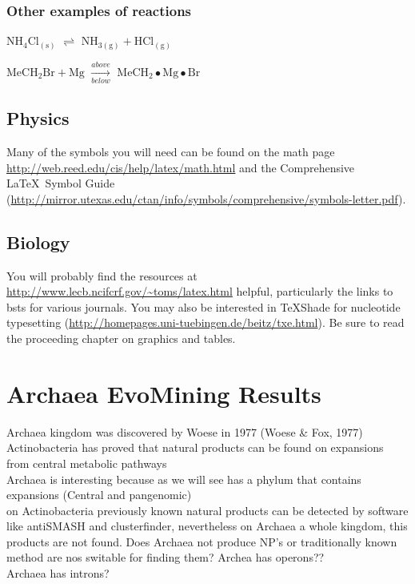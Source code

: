 \documentclass[12pt,twoside]{reedthesis}
\begin{document}
  \subsection{Other examples of
  reactions}\label{other-examples-of-reactions}
  
  \(\mathrm{NH_4Cl_{(s)}}\) \(\rightleftharpoons\)
  \(\mathrm{NH_{3(g)}+HCl_{(g)}}\)
  
  \noindent \(\mathrm{MeCH_2Br + Mg}\) \(\xrightarrow[below]{above}\)
  \(\mathrm{MeCH_2\bullet Mg \bullet Br}\)
  
  \section{Physics}\label{physics}
  
  Many of the symbols you will need can be found on the math page
  \url{http://web.reed.edu/cis/help/latex/math.html} and the Comprehensive
  \LaTeX~Symbol Guide
  (\url{http://mirror.utexas.edu/ctan/info/symbols/comprehensive/symbols-letter.pdf}).
  
  \section{Biology}\label{biology}
  
  You will probably find the resources at
  \url{http://www.lecb.ncifcrf.gov/~toms/latex.html} helpful, particularly
  the links to bsts for various journals. You may also be interested in
  TeXShade for nucleotide typesetting
  (\url{http://homepages.uni-tuebingen.de/beitz/txe.html}). Be sure to
  read the proceeding chapter on graphics and tables.
  
  \hypertarget{refux5flabels}{\chapter{Archaea EvoMining
  Results}\label{refux5flabels}}
  
  Archaea kingdom was discovered by Woese in 1977 (Woese \& Fox, 1977)\\
  Actinobacteria has proved that natural products can be found on
  expansions from central metabolic pathways\\
  Archaea is interesting because as we will see has a phylum that contains
  expansions (Central and pangenomic)\\
  on Actinobacteria previously known natural products can be detected by
  software like antiSMASH and clusterfinder, nevertheless on Archaea a
  whole kingdom, this products are not found. Does Archaea not produce
  NP's or traditionally known method are nos switable for finding them?
  Archea has operons??\\
  Archaea has introns?
  
\end{document}
